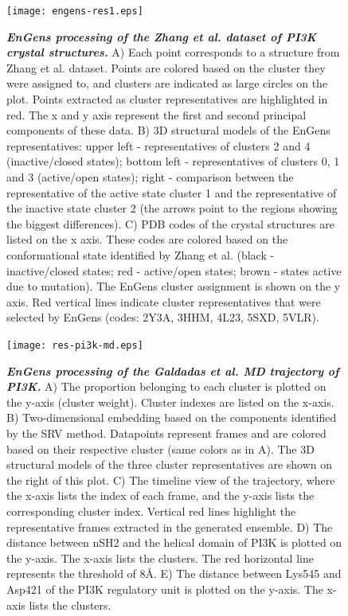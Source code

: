 \documentclass[numsec,webpdf,contemporary,large]{oup-authoring-template}
\theoremstyle{thmstyleone}%
\theoremstyle{thmstyletwo}%
\theoremstyle{thmstylethree}%
\begin{document}
\begin{figure}[!t]%
\centering
{\texttt{[image: engens-res1.eps]}}
\caption{\textbf{\textit{EnGens processing of the  Zhang et al. dataset of PI3K crystal structures.}} A) Each point corresponds to a structure from Zhang et al. dataset. Points are colored based on the cluster they were assigned to, and clusters are indicated as large circles on the plot. Points extracted as cluster representatives are highlighted in red. The x and y axis represent the first and second principal components of these data. B) 3D structural models of the EnGens representatives:  upper left - representatives of clusters 2 and 4 (inactive/closed states); bottom left - representatives of clusters 0, 1 and 3  (active/open states); right - comparison between the representative of the active state cluster 1 and the representative of the inactive state cluster 2 (the arrows point to the regions showing the biggest differences). C) PDB codes of the crystal structures are listed on the x axis. These codes are colored based on the conformational state identified by Zhang et al. (black - inactive/closed states; red - active/open states; brown - states active due to mutation). The EnGens cluster assignment is shown on the y axis. Red vertical lines indicate cluster representatives that were selected by EnGens (codes: 2Y3A, 3HHM, 4L23, 5SXD, 5VLR).}\label{fig-res1a}
\end{figure}


\begin{figure}[!t]%
\centering
{\texttt{[image: res-pi3k-md.eps]}}
\caption{\textbf{\textit{EnGens processing of the Galdadas et al. MD trajectory of PI3K.}} A) The proportion belonging to each cluster is plotted on the y-axis (cluster weight). Cluster indexes are listed on the x-axis. B) Two-dimensional embedding based on the components identified by the SRV method. Datapoints represent frames and are colored based on their respective cluster (same colors as in A). The 3D structural models of the three cluster representatives are shown on the right of this plot. C) The timeline view of the trajectory, where the x-axis lists  the index of each frame, and the y-axis lists the corresponding cluster index. Vertical red lines highlight the representative frames extracted in the generated ensemble. D) The distance between nSH2 and the helical domain of PI3K is plotted on the y-axis. The x-axis lists the clusters. The red horizontal line represents the threshold of 8Å.  E) The distance between Lys545 and Asp421 of the PI3K regulatory unit is plotted on the y-axis. The x-axis lists the clusters.}\label{fig-res1b}
\end{figure}
\end{document}

